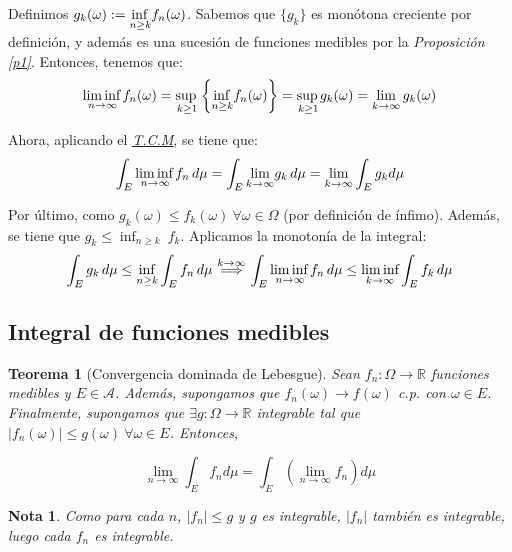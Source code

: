 \documentclass[11pt, a4paper]{article}
\makeatletter
\newif\IfInSansMode
\let\oldsf\sffamily
\renewcommand*{\sffamily}{\oldsf\mathversion{sans}\InSansModetrue}
\let\oldnorm\normalfont
\renewcommand*{\normalfont}{\oldnorm\InSansModefalse\mathversion{normal}}
\newcommand{\R}{\mathbb{R}} \newcommand{\N}{\mathbb{N}}
\newcommand{\w}{\omega}
\renewenvironment{proof}[1][\proofname] {\par\pushQED{\qed}\normalfont\topsep6\p@\@plus6\p@\relax\trivlist\item[\hskip\labelsep\itshape\sffamily#1\@addpunct{.}]\ignorespaces}{\popQED\endtrivlist\@endpefalse}
\theoremstyle{theorem-style}
\newtheorem{nth}{Teorema}[section]
\theoremstyle{definition-style}
\theoremstyle{remark-style}
\newtheorem*{nota}{Nota}
\theoremstyle{example-style}
\makeatother
\begin{document}
  \begin{proof} Definimos $g_k(\omega) :=  \underset{n\geq k}{\text{inf\,} } f_n(\omega )$. Sabemos que $\{g_k\}$ es monótona creciente por definición, y además es una sucesión de funciones medibles por la \textit{Proposición \ref{p1}}. Entonces, tenemos que: $$\underset{n\to \infty}{\text{lim\,inf\,}} f_n (\omega ) = \underset{k\geq 1}{\text{sup\,}}  \left\{ \underset{n\geq k}{\text{inf\,} } f_n(\omega )\right\}  =  \underset{k\geq 1}{\text{sup\,}} g_k(\omega) = \lim_{k\to\infty} g_k(\w)$$ 
  
Ahora, aplicando el \hyperref[tcm]{\textit{T.C.M}}, se tiene que:
\[
\int_E \underset{n\to \infty}{\text{lim\,inf\,}} f_n\, d\mu  =  \int_E \underset{k\to \infty}{\text{lim}} g_k\, d\mu 
 =  \underset{k\to \infty}{\text{lim}}  \int_E g_k d\mu 
\]

Por último, como $g_k(\omega)\leq f_k(\omega) \ \forall \omega\in \Omega $ (por definición de ínfimo). Además, se tiene que $g_k \le \inf_{n\ge k}\ f_k$. Aplicamos la monotonía de la integral:
\[
\int_E g_k\, d\mu  \leq \inf_{n\ge k} \int_E f_n\, d\mu 
\overset{k\to\infty}{\implies}
\int_E \underset{n\to \infty}{\text{lim\,inf\,}} f_n\, d\mu 
\leq   \underset{k\to \infty}{\lim \text{inf}} \int_E f_k\, d\mu
\]
\end{proof}

\subsection{Integral de funciones medibles}



\begin{nth}[Convergencia dominada de Lebesgue]
  Sean $f_n : \Omega \rightarrow \R$ funciones medibles y $E \in \mathscr A$. Además, supongamos que ${f_n(\omega)} \rightarrow f(\omega)$ c.p. con $\omega \in E$. Finalmente, supongamos que $\exists g: \Omega \rightarrow \R$ integrable tal que $|f_n(\omega)| \leq g(\omega) \ \forall \omega \in E$. Entonces,
  
  $$ \lim_{n \to \infty} \int_E f_n d \mu = \int_E  \left( \lim_{n \to \infty} f_n \right) d \mu$$ 
\end{nth}

\begin{nota}
  Como para cada $n$, $|f_n| \leq g$ y $g$ es integrable, $|f_n|$ también es integrable, luego cada $f_n$ es integrable.
\end{nota}
\end{document}
